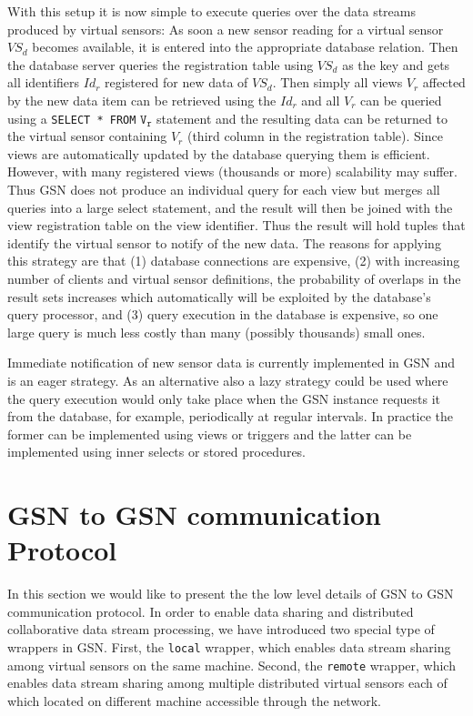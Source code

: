 With this setup it is now simple to execute queries over the data streams
produced by virtual sensors: As soon a new sensor reading for a virtual sensor
$VS_d$ becomes available, it is entered into the appropriate database relation.
Then the database server queries the registration table using $VS_d$ as the key
and gets all identifiers $Id_r$ registered for new data of $VS_d$. Then simply
all views $V_r$ affected by the new data item can be retrieved using the $Id_r$
and all $V_r$ can be queried using a \texttt{SELECT * FROM} $\mathtt{V_r}$
statement and the resulting data can be returned to the virtual sensor
containing $V_r$ (third column in the registration table). Since views are
automatically updated by the database querying them is efficient. However, with
many registered views (thousands or more) scalability may suffer. Thus GSN does
not produce an individual query for each view but merges all queries into a
large select statement, and the result will then be joined with the view
registration table on the view identifier. Thus the result will hold tuples
that identify the virtual sensor to notify of the new data.  The reasons for
applying this strategy are that (1) database connections are expensive, (2)
with increasing number of clients and virtual sensor definitions, the
probability of overlaps in the result sets increases which automatically will
be exploited by the database's query processor, and (3) query execution in the
database is expensive, so one large query is much less costly than many
(possibly thousands) small ones.

Immediate notification of new sensor data is currently implemented in GSN and
is an eager strategy. As an alternative also a lazy strategy could be used
where the query execution would only take place when the GSN instance requests
it from the database, for example, periodically at regular intervals. In
practice the former can be implemented using views or triggers and the latter
can be implemented using inner selects or stored procedures.

\section{GSN to GSN communication Protocol}
In this section we would like to present the the low level details of GSN to GSN communication protocol.
In order to enable data sharing and distributed collaborative data stream processing, we have introduced
two special type of wrappers in GSN. First, the \texttt{local} wrapper, which enables data stream sharing
among virtual sensors on the same machine. Second, the \texttt{remote} wrapper, which enables data stream
sharing among multiple distributed virtual sensors each of which located on different machine accessible through the network. 

